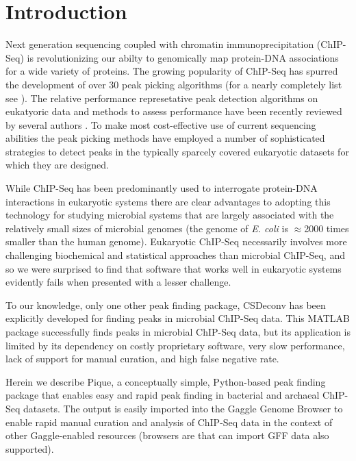 \documentclass{bioinfo}
\begin{document}
\section{Introduction}

\noindent Next generation sequencing coupled with chromatin
immunoprecipitation (ChIP-Seq) is revolutionizing our abilty to
genomically map protein-DNA associations for a wide variety of
proteins.  The growing popularity of ChIP-Seq has spurred the
development of over 30 peak picking algorithms (for a nearly
completely list see \cite{wilbanks}). The relative performance
represetative peak detection algorithms on eukatyoric data and methods
to assess performance have been recently reviewed by several authors
\cite{Pepke, Laajala_review, too_many_peak_callers, peakranger,
  peak_benchmark}.  To make most cost-effective use of current
sequencing abilities the peak picking methods have employed a number
of sophisticated strategies to detect peaks in the typically sparcely
covered eukaryotic datasets for which they are designed.


While ChIP-Seq has been predominantly used to interrogate protein-DNA
interactions in eukaryotic systems there are clear advantages to
adopting this technology for studying microbial systems that are
largely associated with the relatively small sizes of microbial
genomes (the genome of {\em E. coli} is $\approx$2000 times smaller
than the human genome). Eukaryotic ChIP-Seq necessarily involves more
challenging biochemical and statistical approaches than microbial
ChIP-Seq, and so we were surprised to find that software that works
well in eukaryotic systems evidently fails when presented with a
lesser challenge.

To our knowledge, only one other peak finding package, CSDeconv
\cite{CSDeconv} has been explicitly developed for finding peaks in
microbial ChIP-Seq data. This MATLAB package successfully finds peaks
in microbial ChIP-Seq data, but its application is limited by its
dependency on costly proprietary software, very slow performance, lack
of support for manual curation, and high false negative rate.

Herein we describe Pique, a conceptually simple, Python-based peak
finding package that enables easy and rapid peak finding in bacterial
and archaeal ChIP-Seq datasets.  The output is easily imported into
the Gaggle Genome Browser \cite{ggb} to enable rapid manual
curation and analysis of ChIP-Seq data in the context of other
Gaggle-enabled \cite{gaggle} resources (browsers are that can
import GFF data also supported).
\end{document}
